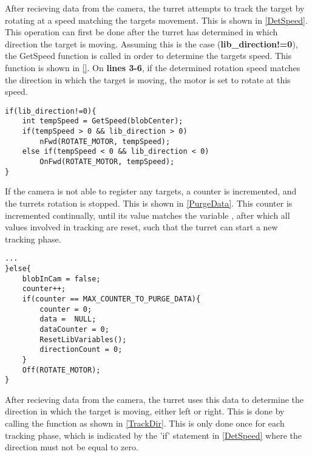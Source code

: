 After recieving data from the camera, the turret attempts to track the target by
rotating at a speed matching the targets movement. This is shown in
\autoref{DetSpeed}. This operation can first be done after the turret has
determined in which direction the target is moving. Assuming this is the case
(\textbf{lib\_direction!=0}), the GetSpeed function is called in order to
determine the targets speed. This function is shown in \autoref{}. On
\textbf{lines 3-6}, if the determined rotation speed matches the direction in
which the target is moving, the motor is set to rotate at this speed.\nl

\begin{minipage}[H]{\linewidth}
\begin{lstlisting}[caption = Determine the targets speed at rotate to match it, label = DetSpeed] 
if(lib_direction!=0){
	int tempSpeed = GetSpeed(blobCenter);
	if(tempSpeed > 0 && lib_direction > 0)
		nFwd(ROTATE_MOTOR, tempSpeed);
	else if(tempSpeed < 0 && lib_direction < 0)
		OnFwd(ROTATE_MOTOR, tempSpeed);
}
\end{lstlisting}
\end{minipage}

If the camera is not able to register any targets, a counter is incremented, and
the turrets rotation is stopped. This is shown in \autoref{PurgeData}. This
counter is incremented continually, until its value matches the variable
, after which all values involved
in tracking are reset, such that the turret can start a new tracking phase.\nl

\begin{minipage}[H]{\linewidth}
\begin{lstlisting}[caption = Reset data and turn off motor is no targets are found., label = PurgeData] 
...
}else{
	blobInCam = false;
    counter++;
    if(counter == MAX_COUNTER_TO_PURGE_DATA){
    	counter = 0;
        data =  NULL;
        dataCounter = 0;
        ResetLibVariables();
        directionCount = 0;
    }
    Off(ROTATE_MOTOR);
}
\end{lstlisting}
\end{minipage}

After recieving data from the camera, the turret uses this data to determine the
direction in which the target is moving, either left or right. This is done by
calling the  function as shown in
\autoref{TrackDir}. This is only done once for each tracking phase, which is
indicated by the 'if' statement in \autoref{DetSpeed} where the direction
must not be equal to zero.\nl

